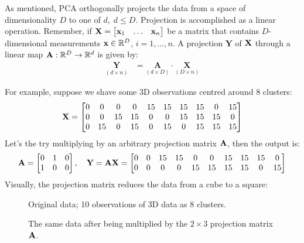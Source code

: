 \documentclass[a4paper]{article}
\begin{document}
 As mentioned, PCA orthogonally projects the data from a space of dimensionality $D$ to one of $d,\; d \leq D$. Projection is accomplished as a linear operation.
 Remember, if $\textbf{X} = \begin{bmatrix}\textbf{x}_1 & \dots & \textbf{x}_n \end{bmatrix}$ be a matrix that contains $D$-dimensional measurements $\textbf{x}\in\mathbb{R}^D$, $i=1,\ldots,n$. A projection $\textbf{Y}$ of $\textbf{X}$ through a linear map $\textbf{A}:\mathbb{R}^D\rightarrow \mathbb{R}^d$ is given by:
 \begin{align}
     \underset{(d\times n)}{\textbf{Y}} &= 
     \underset{(d\times D)}{\textbf{A}}
     \cdot
     \underset{(D\times n)}{\textbf{X}}
\end{align}
 
 \begin{exmp}

 For example, suppose we shave some 3D observations centred around 8 clusters:
 \[
 \textbf{X} =
 \begin{bmatrix}
 0 & 0 & 0 & 0 & 15 & 15 & 15 & 15 & 0 & 15\\
 0 & 0 & 15 & 15 & 0 & 0 & 15 & 15 & 15 & 0\\
 0 & 15 & 0 & 15 & 0 & 15 & 0 & 15 & 15 & 15\\
 \end{bmatrix}
 \]
 Let's the try multiplying by an arbitrary projection matrix $\textbf{A}$, then the output is:
 \[
 \textbf{A} = \begin{bmatrix}
 0 & 1 &0 \\1 &0 &0
 \end{bmatrix}, \quad \textbf{Y} = \textbf{AX} =
 \begin{bmatrix}
 0 &0 &15 &15 &0 &0 &15 &15 &15 &0\\
 0 &0 &0 &0 &15 &15 &15 &15 &0 &15
 \end{bmatrix}
 \]
 Visually, the projection matrix reduces the data from a cube to a square:
 \begin{multicols}{2}
\begin{figure}[H]
    \centering
    
    \caption{Original data; 10 observations of 3D data as 8 clusters.}
\end{figure}
\columnbreak
\begin{figure}[H]
    \centering
    
    \caption{The same data after being multiplied by the $2\times 3$ projection matrix $\textbf{A}$.}
\end{figure}
\end{multicols}
 \end{exmp}
 
\end{document}
